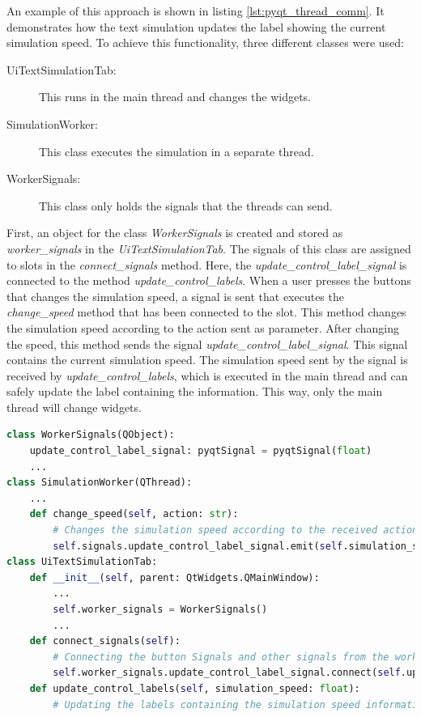 An example of this approach is shown in listing \ref{lst:pyqt_thread_comm}. It demonstrates how the text simulation updates the label showing the current simulation speed. To achieve this functionality, three different classes were used:
\begin{description}
    \item[UiTextSimulationTab:] This runs in the main thread and changes the widgets.
    \item[SimulationWorker:] This class executes the simulation in a separate thread.
    \item[WorkerSignals:] This class only holds the signals that the threads can send.
\end{description}
First, an object for the class \textit{WorkerSignals} is created and stored as \textit{worker\_signals} in the \textit{UiTextSimulationTab}. The signals of this class are assigned to slots in the \textit{connect\_signals} method. Here, the \textit{update\_control\_label\_signal} is connected to the method \textit{update\_control\_labels}. When a user presses the buttons that changes the simulation speed, a signal is sent that executes the \textit{change\_speed} method that has been connected to the slot. This method changes the simulation speed according to the action sent as parameter. After changing the speed, this method sends the signal \textit{update\_control\_label\_signal}. This signal contains the current simulation speed. The simulation speed sent by the signal is received by \textit{update\_control\_labels}, which is executed in the main thread and can safely update the label containing the information. This way, only the main thread will change widgets.
\begin{lstlisting}[language=python, caption={Thread safety example}, label={lst:pyqt_thread_comm}]
class WorkerSignals(QObject):
    update_control_label_signal: pyqtSignal = pyqtSignal(float)
    ...
class SimulationWorker(QThread):
    ...
    def change_speed(self, action: str):
        # Changes the simulation speed according to the received action.
        self.signals.update_control_label_signal.emit(self.simulation_speed)
class UiTextSimulationTab:
    def __init__(self, parent: QtWidgets.QMainWindow):
        ... 
        self.worker_signals = WorkerSignals()
        ...
    def connect_signals(self):
        # Connecting the button Signals and other signals from the worker_signals
        self.worker_signals.update_control_label_signal.connect(self.update_control_labels)
    def update_control_labels(self, simulation_speed: float):
        # Updating the labels containing the simulation speed information.
\end{lstlisting}

